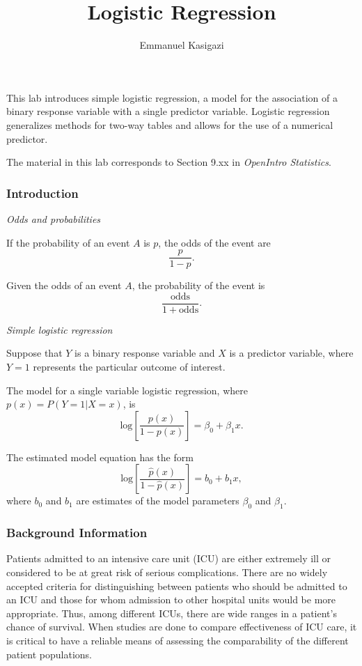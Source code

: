 \documentclass[
]{article}
\title{Logistic Regression}
\author{Emmanuel Kasigazi}
\date{}
\begin{document}
\maketitle

This lab introduces simple logistic regression, a model for the
association of a binary response variable with a single predictor
variable. Logistic regression generalizes methods for two-way tables and
allows for the use of a numerical predictor.

The material in this lab corresponds to Section 9.xx in \emph{OpenIntro
Statistics}.

\subsubsection{Introduction}\label{introduction}

\emph{Odds and probabilities}

If the probability of an event \(A\) is \(p\), the odds of the event are
\[\dfrac{p}{1 - p}. \]

Given the odds of an event \(A\), the probability of the event is
\[\dfrac{\text{odds}}{1 + \text{odds}}. \]

\emph{Simple logistic regression}

Suppose that \(Y\) is a binary response variable and \(X\) is a
predictor variable, where \(Y = 1\) represents the particular outcome of
interest.

The model for a single variable logistic regression, where
\(p(x) = P(Y = 1 | X = x)\), is
\[\text{log} \left[ \dfrac{p(x)}{1 - p(x)} \right] = \beta_0 + \beta_1 x. \]

The estimated model equation has the form
\[\text{log} \left[ \dfrac{\hat{p}(x)}{1 - \hat{p}(x)} \right] = b_0 + b_1 x, \]
where \(b_0\) and \(b_1\) are estimates of the model parameters
\(\beta_0\) and \(\beta_1\).

\subsubsection{Background Information}\label{background-information}

Patients admitted to an intensive care unit (ICU) are either extremely
ill or considered to be at great risk of serious complications. There
are no widely accepted criteria for distinguishing between patients who
should be admitted to an ICU and those for whom admission to other
hospital units would be more appropriate. Thus, among different ICUs,
there are wide ranges in a patient's chance of survival. When studies
are done to compare effectiveness of ICU care, it is critical to have a
reliable means of assessing the comparability of the different patient
populations.
\end{document}

